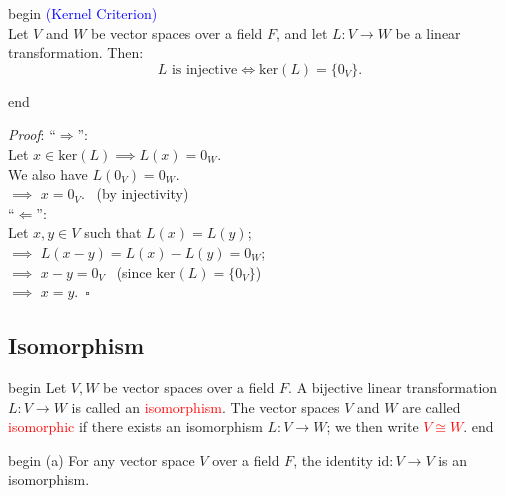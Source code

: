 \documentclass[
  12pt,
  a4paper,
  twoside]{article}
\theoremstyle{plain}
\theoremstyle{definition}
\begin{document}
\csname begin\label{cnj:prop-kernel-criterion}
\textcolor{blue}{(Kernel Criterion)}\\
Let \(V\) and \(W\) be vector spaces over a field \(F\), and let \(L:V \to W\) be a linear transformation. Then:\\
\[
L \text{ is injective} \iff \mathrm{ker}(L) = \{ 0_{V} \}.
\]

\csname end

\emph{Proof}: ``\(\Longrightarrow\)'':\\
Let \(x\in\mathrm{ker}(L) \implies L(x)=0_W\).\\
We also have \(L(0_V)=0_W\).\\
\(\implies\) \(x=0_V\). \hfill~{(by injectivity)}\\
``\(\Longleftarrow\)'':\\
Let \(x,y \in V\) such that \(L(x) = L(y)\);\\
\(\implies\) \(L(x-y) = L(x) - L(y) = 0_{W}\);\\
\(\implies\) \(x - y = 0_{V}\) \hfill~{(since \(\mathrm{ker}(L) = \{ 0_{V} \}\))}\\
\(\implies\) \(x=y\).\hfill~{\(\square\)}

\hypertarget{ss-isomorphism}{%
\subsection{Isomorphism}\label{ss-isomorphism}}

\csname begin\label{cnj:defn-isomorphism}
Let \(V,W\) be vector spaces over a field \(F\). A bijective linear transformation \(L: V \to W\) is called an \textcolor{red}{isomorphism}. The vector spaces \(V\) and \(W\) are called \textcolor{red}{isomorphic} if there exists an isomorphism \(L: V \to W\); we then write \textcolor{red}{$V \cong W$}.
\csname end

\csname begin\label{cnj:expl-isomorphism}
(a) For any vector space \(V\) over a field \(F\), the identity \(\mathrm{id}: V \to V\) is an isomorphism.
\end{document}
